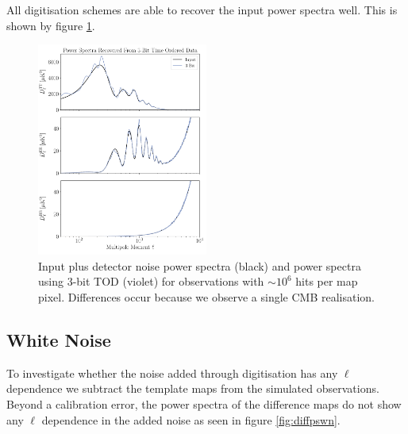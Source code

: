 \documentclass[apj]{emulateapj}
\begin{document}
All digitisation schemes are able to recover the input power spectra well. This is shown by figure \ref{fig:psrecover}.


\begin{figure}[htb]\centering
\includegraphics[width=0.5\textwidth,clip]{Plots/psrecovery.pdf}
  \caption[Current ]{
  Input plus detector noise power spectra (black) and power spectra using 3-bit TOD (violet) for observations with $\sim 10^6$ hits per map pixel. Differences occur because we observe a single CMB realisation.
\label{fig:psrecover}
}
\end{figure}

\subsection{White Noise}
\label{subsec:whitenoise}

To investigate whether the noise added through digitisation has any $\ell$ dependence we subtract the template maps from the simulated observations. Beyond a calibration error, the power spectra of the difference maps do not show any $\ell$ dependence in the added noise as seen in figure \ref{fig:diffpswn}. %
\end{document}
